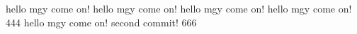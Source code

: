 hello mgy  come on!
hello mgy  come on!
hello mgy  come on!
hello mgy  come on! 444
hello mgy  come on!
second commit!  666
